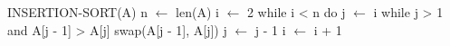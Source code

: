 \begin{pseudocode}[caption={Algoritmo de ordenação por inserção}, label={insertionSortP}]
INSERTION-SORT(A)
n $\gets$ len(A)
i $\gets$ 2
while i < n do
    j $\gets$ i
    while j > 1 and A[j - 1] > A[j]
        swap(A[j - 1], A[j])
        j $\gets$ j - 1
    i $\gets$ i + 1
\end{pseudocode}